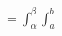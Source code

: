 \documentclass[preview]{standalone}
\begin{document}
\begin{align*}
= \int_{\alpha}^{\beta} \int_{a}^{b}
\end{align*}
\end{document}
